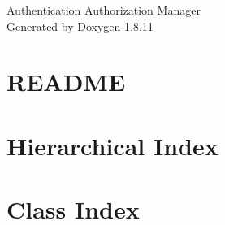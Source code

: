 \documentclass[twoside]{book}
\newcommand{\+}{\discretionary{\mbox{\scriptsize$\hookleftarrow$}}{}{}}
\newcommand{\clearemptydoublepage}{%
  \newpage{\pagestyle{empty}\cleardoublepage}%
}
\begin{document}
\hypersetup{pageanchor=false,
             bookmarksnumbered=true,
             pdfencoding=unicode
            }
\begin{titlepage}
\vspace*{7cm}
\begin{center}%
{\Large Authentication Authorization Manager }\\
\vspace*{1cm}
{\large Generated by Doxygen 1.8.11}\\
\end{center}
\end{titlepage}
\clearemptydoublepage
\tableofcontents
\clearemptydoublepage
{}
\hypersetup{pageanchor=true}

\chapter{R\+E\+A\+D\+ME}
\label{md_README}
\hypertarget{md_README}{}

\chapter{Hierarchical Index}

\chapter{Class Index}

\end{document}
